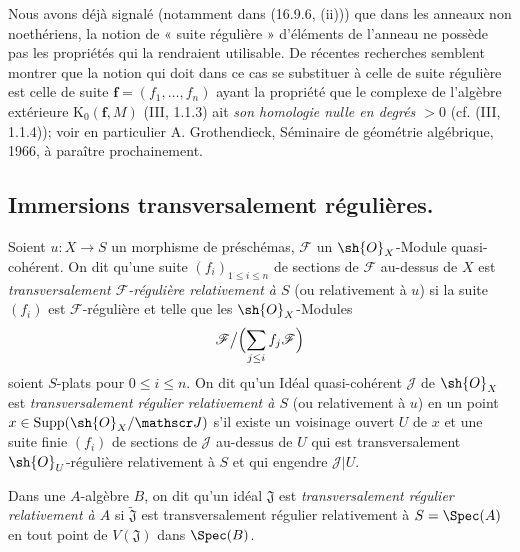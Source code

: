 \begin{env}[19.1.8]
\label{IV.19.1.8}
Nous avons déjà signalé (notamment dans (16.9.6, (ii))) que dans les anneaux non noethériens, la notion de « suite régulière » d'éléments de l'anneau ne possède pas les propriétés qui la rendraient utilisable. De récentes recherches semblent montrer que la notion qui doit dans ce cas se substituer à celle de suite régulière est celle de suite $\mathbf f=(f_1,\ldots,f_n)$ ayant la propriété que le complexe de l'algèbre extérieure $\mathrm K_0(\mathbf f,M)$ (III, 1.1.3) ait \emph{son homologie nulle en degrés $>0$} (cf. (III, 1.1.4)); voir en particulier A. Grothendieck, Séminaire de géométrie algébrique, 1966, à paraître prochainement.
\end{env}

\subsection{Immersions transversalement régulières.}


\begin{definition}[19.2.1]
Soient $u:X\to S$ un morphisme de préschémas, $\mathscr F$ un $\sh{O}_X$-Module quasi-cohérent. On dit qu'une suite $(f_i)_{1\leq i\leq n}$ de sections de $\mathscr F$ au-dessus de $X$ est \emph{transversalement $\mathscr F$-régulière relativement à $S$} (ou relativement à $u$) si la suite $(f_i)$ est $\mathscr F$-régulière et telle que les $\sh{O}_X$-Modules
\[
  \mathscr F\big/\Bigl(\sum_{j\leq i}f_j\mathscr F\Bigr)
\]
soient $S$-plats pour $0\leq i\leq n$. On dit qu'un Idéal quasi-cohérent $\mathscr J$ de $\sh{O}_X$ est \emph{transversalement régulier relativement à $S$} (ou relativement à $u$) en un point $x\in\operatorname{Supp}(\sh{O}_X/\mathscr J)$ s'il existe un voisinage ouvert $U$ de $x$ et une suite finie $(f_i)$ de sections de $\mathscr J$ au-dessus de $U$ qui est transversalement $\sh{O}_U$-régulière relativement à $S$ et qui engendre $\mathscr J|U$.

Dans une $A$-algèbre $B$, on dit qu'un idéal $\mathfrak J$ est \emph{transversalement régulier relativement à $A$} si $\widetilde{\mathfrak J}$ est transversalement régulier relativement à $S=\Spec(A)$ en tout point de $V(\mathfrak J)$ dans $\Spec(B)$.
\end{definition}

